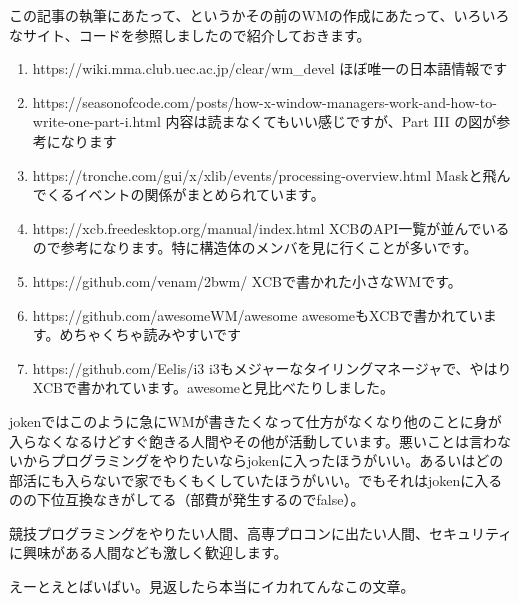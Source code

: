 \documentclass[12pt,a4paper]{jsarticle}
\begin{document}
この記事の執筆にあたって、というかその前のWMの作成にあたって、いろいろなサイト、コードを参照しましたので紹介しておきます。

\begin{enumerate}
\item https://wiki.mma.club.uec.ac.jp/clear/wm\_devel ほぼ唯一の日本語情報です
\item https://seasonofcode.com/posts/how-x-window-managers-work-and-how-to-write-one-part-i.html 内容は読まなくてもいい感じですが、Part III の図が参考になります
\item https://tronche.com/gui/x/xlib/events/processing-overview.html Maskと飛んでくるイベントの関係がまとめられています。
\item https://xcb.freedesktop.org/manual/index.html XCBのAPI一覧が並んでいるので参考になります。特に構造体のメンバを見に行くことが多いです。
\item https://github.com/venam/2bwm/ XCBで書かれた小さなWMです。
\item https://github.com/awesomeWM/awesome awesomeもXCBで書かれています。めちゃくちゃ読みやすいです
\item https://github.com/Eelis/i3 i3もメジャーなタイリングマネージャで、やはりXCBで書かれています。awesomeと見比べたりしました。
\end{enumerate}

jokenではこのように急にWMが書きたくなって仕方がなくなり他のことに身が入らなくなるけどすぐ飽きる人間やその他が活動しています。悪いことは言わないからプログラミングをやりたいならjokenに入ったほうがいい。あるいはどの部活にも入らないで家でもくもくしていたほうがいい。でもそれはjokenに入るのの下位互換なきがしてる（部費が発生するのでfalse）。

競技プログラミングをやりたい人間、高専プロコンに出たい人間、セキュリティに興味がある人間なども激しく歓迎します。

えーとえとばいばい。見返したら本当にイカれてんなこの文章。
\end{document}
